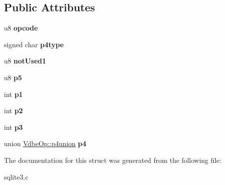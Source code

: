 \subsection*{Public Attributes}
\begin{DoxyCompactItemize}
\item 
u8 {\bfseries opcode}\hypertarget{structVdbeOp_ae12a8e7a8f5f7ba39fa379c9ad287837}{}\label{structVdbeOp_ae12a8e7a8f5f7ba39fa379c9ad287837}

\item 
signed char {\bfseries p4type}\hypertarget{structVdbeOp_a124dee58d3e0d73c7dfaf811a3311023}{}\label{structVdbeOp_a124dee58d3e0d73c7dfaf811a3311023}

\item 
u8 {\bfseries not\+Used1}\hypertarget{structVdbeOp_a15efd0061302e39e9025b5444c8fc5d8}{}\label{structVdbeOp_a15efd0061302e39e9025b5444c8fc5d8}

\item 
u8 {\bfseries p5}\hypertarget{structVdbeOp_a5e807981f52d29c06a5b6d4a8f2f4595}{}\label{structVdbeOp_a5e807981f52d29c06a5b6d4a8f2f4595}

\item 
int {\bfseries p1}\hypertarget{structVdbeOp_a17c8326a1e3ac5612d4aaaa88f383b3b}{}\label{structVdbeOp_a17c8326a1e3ac5612d4aaaa88f383b3b}

\item 
int {\bfseries p2}\hypertarget{structVdbeOp_aba021fa9d30343c16794d9b76d8bffcd}{}\label{structVdbeOp_aba021fa9d30343c16794d9b76d8bffcd}

\item 
int {\bfseries p3}\hypertarget{structVdbeOp_ad7ef3319da20d5423b8cc5da6995d193}{}\label{structVdbeOp_ad7ef3319da20d5423b8cc5da6995d193}

\item 
union \hyperlink{unionVdbeOp_1_1p4union}{Vdbe\+Op\+::p4union} {\bfseries p4}\hypertarget{structVdbeOp_a985bba6c3cd8e093d029e4462f8b4a59}{}\label{structVdbeOp_a985bba6c3cd8e093d029e4462f8b4a59}

\end{DoxyCompactItemize}


The documentation for this struct was generated from the following file\+:\begin{DoxyCompactItemize}
\item 
sqlite3.\+c\end{DoxyCompactItemize}
